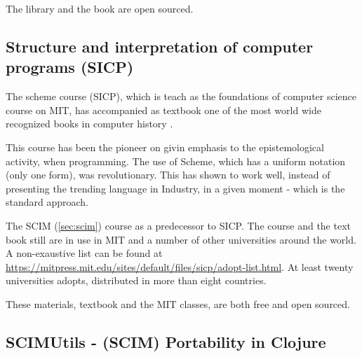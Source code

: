 \documentclass[
12pt,				%
openright,			%
oneside,			%
a4paper,			%
brazil,				%
english,			%
]{abntex2}
\begin{document}
The library and the book are open sourced.

\subsection{Structure and interpretation of computer programs (SICP)}
The scheme course (SICP), which is teach as the foundations of
computer science course on MIT, has accompanied as textbook one of the
most world wide recognized books in computer history
\cite{abelson1996structure}.

This course has been the pioneer on givin emphasis to the
epistemological activity, when programming. The use of Scheme, which
has a uniform notation (only one form), was revolutionary. This has
shown to work well, instead of presenting the trending language
in Industry, in a given moment - which is the standard approach.  

The SCIM (\autoref{sec:scim}) course as a predecessor to SICP. The course and
the text book still are in use in MIT and a number of other
universities around the world. A non-exaustive list can be found at
\url{https://mitpress.mit.edu/sites/default/files/sicp/adopt-list.html}. At
least twenty universities adopts, distributed in more than eight countries.

These materials, textbook and the MIT classes, are both free and open
sourced.
\subsection{SCIMUtils - (SCIM) Portability in Clojure}
\label{sec:scimutils}
\end{document}
